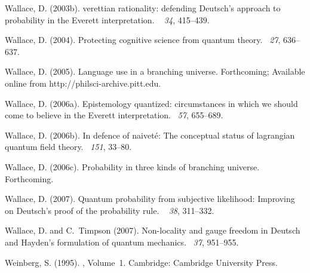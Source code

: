 \documentclass[12pt]{article}
\begin{document}
\begin{thebibliography}{}
Wallace, D. (2003b).
verettian rationality: defending {D}eutsch's approach to
  probability in the {E}verett interpretation.
~{\em
  34}, 415--439.

Wallace, D. (2004).
\newblock Protecting cognitive science from quantum theory.
~{\em 27}, 636--637.

Wallace, D. (2005).
\newblock Language use in a branching universe.
\newblock Forthcoming; Available online from http://philsci-archive.pitt.edu.

Wallace, D. (2006a).
\newblock Epistemology quantized: circumstances in which we should come to
  believe in the {E}verett interpretation.
~{\em 57},
  655--689.

Wallace, D. (2006b).
\newblock In defence of naivet{\'{e}}: The conceptual status of lagrangian
  quantum field theory.
~{\em 151}, 33--80.

Wallace, D. (2006c).
\newblock Probability in three kinds of branching universe.
\newblock Forthcoming.

Wallace, D. (2007).
\newblock Quantum probability from subjective likelihood: Improving on
  {D}eutsch's proof of the probability rule.
~{\em
  38}, 311--332.

Wallace, D. and C.~Timpson (2007).
\newblock Non-locality and gauge freedom in {D}eutsch and {H}ayden's
  formulation of quantum mechanics.
~{\em 37}, 951--955.

Weinberg, S. (1995).
, Volume~1.
\newblock Cambridge: Cambridge University Press.


\end{thebibliography}
\end{document}
